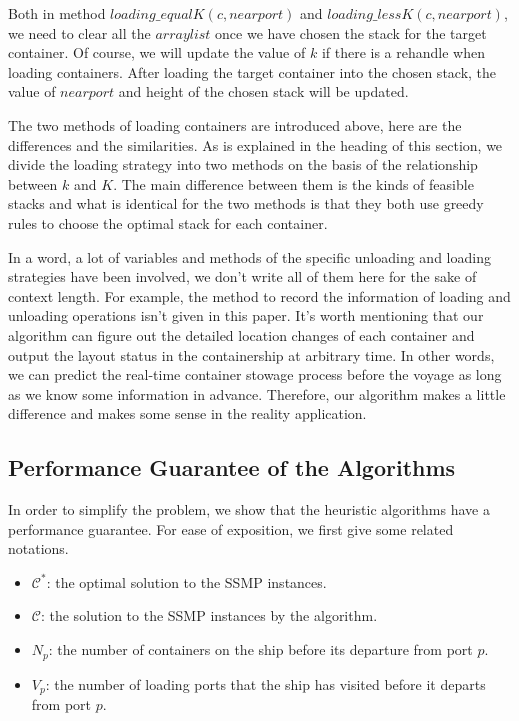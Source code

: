 \documentclass[review,3p,times,authoryear,12pt]{elsarticle}
\begin{document}
Both in method $loading\_equalK(c,nearport)$ and $loading\_lessK(c,nearport)$, we need to clear all the $arraylist$ once we have chosen the stack for the target container.
Of course, we will update the value of $k$ if there is a rehandle when loading containers.
After loading the target container into the chosen stack, the value of $nearport$ and height of the chosen stack will be updated.

The two methods of loading containers are introduced above, here are the differences and the similarities.
As is explained in the heading of this section, we divide the loading strategy into two methods on the basis of the relationship between $k$ and $K$.
The main difference between them is the kinds of feasible stacks and what is identical for the two methods is that they both use greedy rules to choose the optimal stack for each container.

In a word, a lot of variables and methods of the specific unloading and loading strategies have been involved, we don't write all of them here for the sake of context length.
For example, the method to record the information of loading and unloading operations isn't given in this paper.
It's worth mentioning that our algorithm can figure out the detailed location changes of each container and output the layout status in the containership at arbitrary time.
In other words, we can predict the real-time container stowage process before the voyage as long as we know some information in advance.
Therefore, our algorithm makes a little difference and makes some sense in the reality application.


\subsection{Performance Guarantee of the Algorithms}
\label{sec:p3}

In order to simplify the problem, we show that the heuristic algorithms have a performance guarantee.
For ease of exposition, we first give some related notations.

\begin{itemize}
\item $\mathcal{C}^*$: the optimal solution to the SSMP instances.
\item $\mathcal{C}$: the solution to the SSMP instances by the algorithm.
\item $N_p$: the number of containers on the ship before its departure from port $p$.
\item $V_p$: the number of loading ports that the ship has visited before it departs from port $p$.
\end{itemize}
\end{document}
